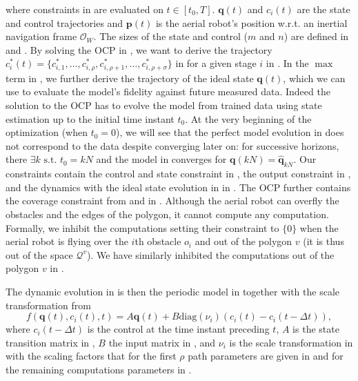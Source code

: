 where constraints in  are evaluated on $t\in[t_0,T]$. $\mathbf{q}(t)$ and $c_i(t)$ are the state and control trajectories and $\mathbf{p}(t)$ is the aerial robot's position w.r.t. an inertial navigation frame $\mathcal{O}_W$. The sizes of the state and control ($m$ and $n$) are defined in  and . By solving the OCP in , we want to derive the trajectory $c_i^*(t)=\{c^*_{i,1},\dots,c^*_{i,\rho},c^*_{i,\rho+1},\dots,c^*_{i,\rho+\sigma}\}$ in  for a given stage $i$ in . In the $\max$ term in , we further derive the trajectory of the ideal state $\mathbf{q}(t)$, which we can use to evaluate the model's fidelity against future measured data. Indeed the solution to the OCP has to  evolve the model from trained data using state estimation up to the initial time instant $t_0$. At the very beginning of the optimization (when $t_0=0$), we will see that the perfect model evolution in  does not correspond to the data despite converging later on: for successive horizons, there $\exists k\text{ s.t. }t_0=kN$ and the model in  converges for $\mathbf{q}(kN)=\hat{\mathbf{q}}_{kN}$. Our constraints contain the control and state constraint in , the output constraint in , and the dynamics with the ideal state evolution in  in . The OCP further contains the coverage constraint from  and  in . Although the aerial robot can overfly the obstacles and the edges of the polygon, it cannot compute any computation. Formally, we inhibit the computations setting their constraint to $\{0\}$ when the aerial robot is flying over the $i$th obstacle $o_i$ and out of the polygon $v$ (it is thus out of the space $\mathcal{Q}^v$). We have similarly inhibited the computations out of the polygon $v$ in .

The dynamic evolution in  is then the periodic model in  together with the scale transformation from 
\begin{equation}\label{eq:perf-model-in-mpc}
  f(\mathbf{q}(t),c_i(t),t)=A\mathbf{q}(t)+B\mathrm{diag}(\nu_i)(c_i(t)-c_i(t-\Delta t)),
\end{equation}
where $c_i(t-\Delta t)$ is the control at the time instant preceding $t$, $A$ is the state transition matrix in , $B$ the input matrix in , and $\nu_i$ is the scale transformation in  with the scaling factors that for the first $\rho$ path parameters are given in  and for the remaining computations parameters in .

